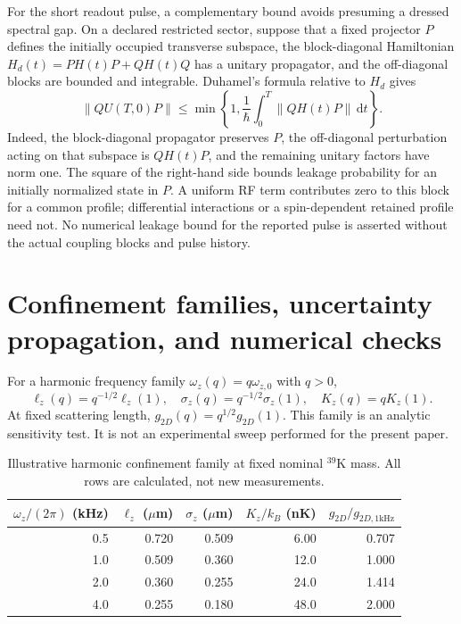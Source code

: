 \documentclass[11pt,a4paper]{article}
\theoremstyle{definition}
\theoremstyle{remark}
\newcommand{\dd}{\mathrm{d}}
\newcommand{\lop}{\ell_z}
\begin{document}
For the short readout pulse, a complementary bound avoids presuming a dressed spectral gap. On a declared restricted sector, suppose that a fixed projector $P$ defines the initially occupied transverse subspace, the block-diagonal Hamiltonian $H_d(t)=PH(t)P+QH(t)Q$ has a unitary propagator, and the off-diagonal blocks are bounded and integrable. Duhamel's formula relative to $H_d$ gives
\begin{equation}
 \|QU(T,0)P\|
 \leq\min\!\left\{1,\frac1\hbar\int_0^T
                         \|QH(t)P\|\,\dd t\right\}.
 \label{eq:pulse_leakage_bound}
\end{equation}
Indeed, the block-diagonal propagator preserves $P$, the off-diagonal perturbation acting on that subspace is $QH(t)P$, and the remaining unitary factors have norm one. The square of the right-hand side bounds leakage probability for an initially normalized state in $P$. A uniform RF term contributes zero to this block for a common profile; differential interactions or a spin-dependent retained profile need not. No numerical leakage bound for the reported pulse is asserted without the actual coupling blocks and pulse history.\cite{zhang2026,precursor}

\section{Confinement families, uncertainty propagation, and numerical checks}
\label{app:numeric}
For a harmonic frequency family $\omega_z(q)=q\omega_{z,0}$ with $q>0$,
\begin{equation}
 \lop(q)=q^{-1/2}\lop(1),\quad
 \sigma_z(q)=q^{-1/2}\sigma_z(1),\quad
 K_z(q)=qK_z(1).
 \label{eq:q_family}
\end{equation}
At fixed scattering length, $g_{2D}(q)=q^{1/2}g_{2D}(1)$. This family is an analytic sensitivity test. It is not an experimental sweep performed for the present paper.

\begin{table}[htbp]
\centering\small
\caption{Illustrative harmonic confinement family at fixed nominal $^{39}\mathrm K$ mass. All rows are calculated, not new measurements.}
\label{tab:family}
\begin{tabular}{@{}rrrrr@{}}
\toprule
$\omega_z/(2\pi)$ (kHz)&$\lop$ ($\mu$m)&$\sigma_z$ ($\mu$m)&$K_z/k_B$ (nK)&$g_{2D}/g_{2D,1\mathrm{kHz}}$\\\midrule
0.5&0.720&0.509&6.00&0.707\\
1.0&0.509&0.360&12.0&1.000\\
2.0&0.360&0.255&24.0&1.414\\
4.0&0.255&0.180&48.0&2.000\\
\bottomrule
\end{tabular}
\end{table}
\end{document}
